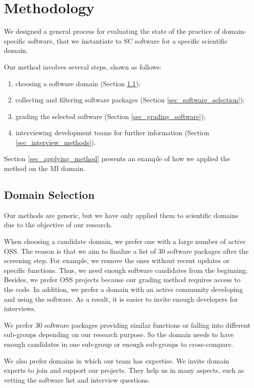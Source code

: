 \chapter{Methodology}
\label{ch_methods}

We designed a general process for evaluating the state of the practice of domain-specific software, that we instantiate to SC software for a specific scientific domain.

Our method involves several steps, shown as follows:
\begin{enumerate}
\item choosing a software domain (Section \ref{sec_domain_selection});
\item collecting and filtering software packages (Section \ref{sec_software_selection});
\item grading the selected software (Section \ref{sec_grading_software});
\item interviewing development teams for further information (Section \ref{sec_interview_methods}).
\end{enumerate}

Section \ref{sec_applying_method} presents an example of how we applied the method on the MI domain.

\section{Domain Selection}
\label{sec_domain_selection}
Our methods are generic, but we have only applied them to scientific domains due to the objective of our research.

When choosing a candidate domain, we prefer one with a large number of active OSS. The reason is that we aim to finalize a list of 30 software packages \cite{SmithEtAl2021} after the screening step. For example, we remove the ones without recent updates or specific functions. Thus, we need enough software candidates from the beginning. Besides, we prefer OSS projects because our grading method requires access to the code. In addition, we prefer a domain with an active community developing and using the software. As a result, it is easier to invite enough developers for interviews.

We prefer 30 software packages providing similar functions or falling into different sub-groups depending on our research purpose. So the domain needs to have enough candidates in one sub-group or enough sub-groups to cross-compare.

We also prefer domains in which our team has expertise. We invite domain experts to join and support our projects. They help us in many aspects, such as vetting the software list and interview questions.

